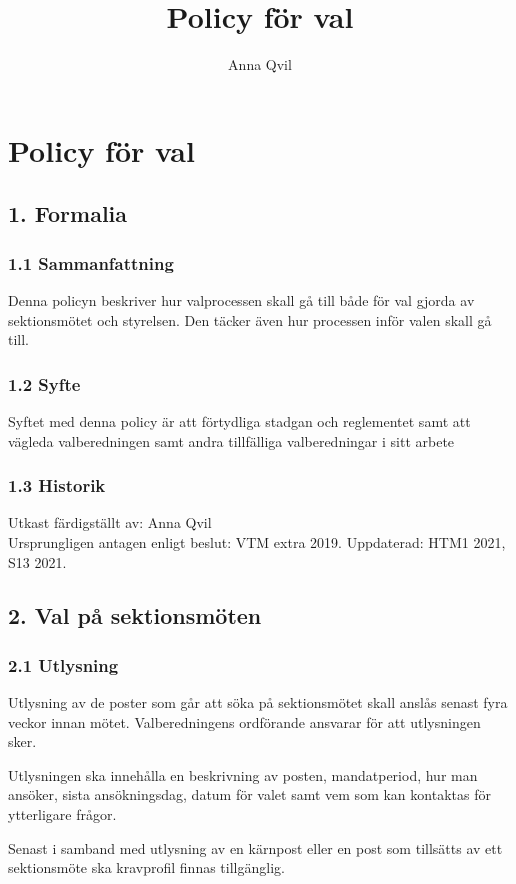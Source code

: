 \documentclass{dsekkallelse}
\title{Policy för val}
\author{Anna Qvil}
\begin{document}
\section{Policy för val}

\subsection{1. Formalia}

\subsubsection{1.1 Sammanfattning}
Denna policyn beskriver hur valprocessen skall gå till både för val gjorda av sektionsmötet och styrelsen. Den täcker även hur processen inför valen skall gå till. 

\subsubsection{1.2 Syfte}
Syftet med denna policy är att förtydliga stadgan och reglementet samt att vägleda valberedningen samt andra tillfälliga valberedningar i sitt arbete

\subsubsection{1.3 Historik}
Utkast färdigställt av: Anna Qvil \\
Ursprungligen antagen enligt beslut: VTM extra 2019.
Uppdaterad: HTM1 2021, S13 2021. 

\subsection{2. Val på sektionsmöten}

\subsubsection{2.1 Utlysning}
Utlysning av de poster som går att söka på sektionsmötet skall anslås senast fyra veckor innan mötet. Valberedningens ordförande ansvarar för att utlysningen sker. 

Utlysningen ska innehålla en beskrivning av posten, mandatperiod, hur man ansöker, sista  ansökningsdag, datum för valet samt vem som kan kontaktas för ytterligare frågor. 

Senast i samband med utlysning av en kärnpost eller en post som tillsätts av ett sektionsmöte ska kravprofil finnas tillgänglig.
\end{document}
